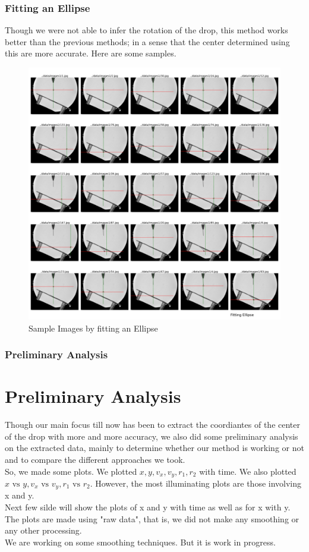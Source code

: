 \documentclass{beamer}
\begin{document}
\begin{frame}
    \frametitle{Fitting an Ellipse}
    \small
    Though we were not able to infer the rotation of the drop, this method works better than the previous methods; in a sense that the center determined using this are more accurate. Here are some samples.
    \begin{figure}
        \centering
        \includegraphics[scale=0.07]{using_ap.png}
        \caption[]{Sample Images by fitting an Ellipse}
    \end{figure}
\end{frame}
\begin{frame}
    \frametitle{Preliminary Analysis}
    \section{Preliminary Analysis}
    Though our main focus till now has been to extract the coordiantes of the center of the drop with more and more accuracy, we also did some preliminary analysis on the extracted data, mainly to determine whether our method is working or not and to compare the different approaches we took.\\
    So, we made some plots. We plotted \(x, y, v_x, v_y, r_1, r_2\) with time. We also plotted \(x \text{ vs } y, v_x \text{ vs } v_y, r_1 \text{ vs } r_2\). However, the most illuminating plots are those involving x and y.\\
    Next few silde will show the plots of x and y with time as well as for x with y. The plots are made using "raw data", that is, we did not make any smoothing or any other processing.\\
    We are working on some smoothing techniques. But it is work in progress.
\end{frame}
\end{document}
